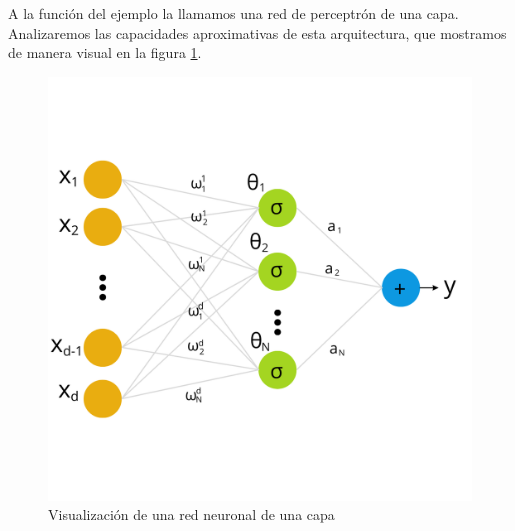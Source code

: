 \documentclass[letterpaper,11pt]{article} %
\theoremstyle{defbreak}
\theoremstyle{propbreak}
\theoremstyle{remark}
\theoremstyle{break}
\begin{document}
\newp A la función del ejemplo la llamamos una red de perceptrón de una capa. Analizaremos las capacidades aproximativas de esta arquitectura, que mostramos de manera visual en la figura \ref{fig:MLP}.
\begin{figure}
    \centering
    \includegraphics[scale=1.2]{img/MLP.png}
    \caption{Visualización de una red neuronal de una capa}
    \label{fig:MLP}
\end{figure}

\end{document}
